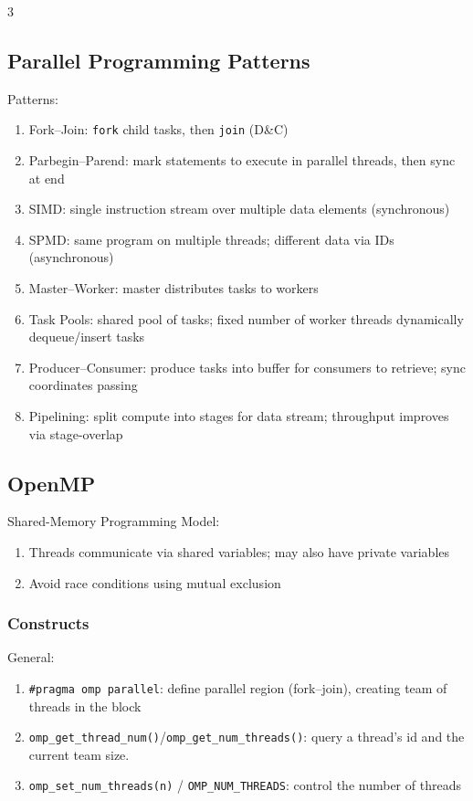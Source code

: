 \documentclass[12pt, a4paper]{article}
\begin{document}
\begin{multicols*}{3}
\subsection{Parallel Programming Patterns}
Patterns:
\begin{enumerate}[\roman*.]
  \item Fork--Join: \lstinline|fork| child tasks, then \lstinline|join| (D\&C)
  \item Parbegin--Parend: mark statements to execute in parallel threads, then sync at end
  \item SIMD: single instruction stream over multiple data elements (synchronous)
  \item SPMD: same program on multiple threads; different data via IDs (asynchronous)
  \item Master--Worker: master distributes tasks to workers
  \item Task Pools: shared pool of tasks; fixed number of worker threads dynamically dequeue/insert tasks
  \item Producer--Consumer: produce tasks into buffer for consumers to retrieve; sync coordinates passing 
  \item Pipelining: split compute into stages for data stream; throughput improves via stage-overlap
\end{enumerate}
\vspace{-1em}
\colbreak
\subsection{OpenMP}
Shared-Memory Programming Model:
\begin{enumerate}[\roman*.]
  \item Threads communicate via shared variables; may also have private variables
  \item Avoid race conditions using mutual exclusion
\end{enumerate} 

\subsubsection{Constructs}
General:
\begin{enumerate}[\roman*.]
  \item \lstinline|#pragma omp parallel|: define parallel region (fork--join), creating team of threads in the block
  \item \lstinline|omp_get_thread_num()|/\lstinline|omp_get_num_threads()|: query a thread's id and the current team size.
  \item \lstinline|omp_set_num_threads(n)| / \lstinline|OMP_NUM_THREADS|: control the number of threads 
\end{enumerate}


\end{multicols*}
\end{document}
